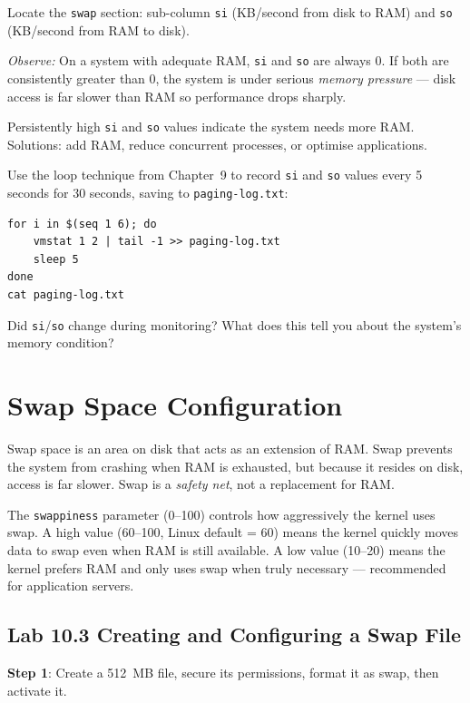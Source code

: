 Locate the \texttt{swap} section: sub-column \texttt{si} (KB/second from disk to
RAM) and \texttt{so} (KB/second from RAM to disk).

\textit{Observe:} On a system with adequate RAM, \texttt{si} and \texttt{so} are
always 0. If both are consistently greater than 0, the system is under serious
\textit{memory pressure} --- disk access is far slower than RAM so performance
drops sharply.

\begin{warningbox}
Persistently high \texttt{si} and \texttt{so} values indicate the system needs
more RAM. Solutions: add RAM, reduce concurrent processes, or optimise applications.
\end{warningbox}

\begin{challengebox}
Use the loop technique from Chapter~9 to record \texttt{si} and \texttt{so} values
every 5 seconds for 30 seconds, saving to \texttt{paging-log.txt}:
\begin{lstlisting}
for i in $(seq 1 6); do
    vmstat 1 2 | tail -1 >> paging-log.txt
    sleep 5
done
cat paging-log.txt
\end{lstlisting}
Did \texttt{si}/\texttt{so} change during monitoring? What does this tell you
about the system's memory condition?
\end{challengebox}

\section{Swap Space Configuration}

Swap space is an area on disk that acts as an extension of RAM. Swap prevents
the system from crashing when RAM is exhausted, but because it resides on disk,
access is far slower. Swap is a \textit{safety net}, not a replacement for RAM.

The \texttt{swappiness} parameter (0--100) controls how aggressively the kernel
uses swap. A high value (60--100, Linux default = 60) means the kernel quickly
moves data to swap even when RAM is still available. A low value (10--20) means
the kernel prefers RAM and only uses swap when truly necessary --- recommended for
application servers.

\subsection*{Lab 10.3 Creating and Configuring a Swap File}

\textbf{Step 1}: Create a 512~MB file, secure its permissions, format it as swap,
then activate it.

